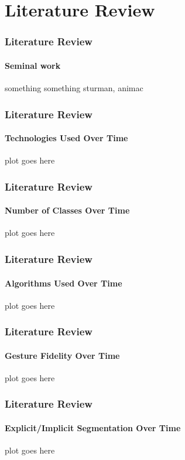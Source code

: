 \documentclass[xcolor={svgnames,table},10pt,fleqn]{beamer}
\begin{document}
\section{Literature Review}
\begin{frame}
    \frametitle{Literature Review}
    \framesubtitle{Seminal work}
    something something sturman, animac
\end{frame}

\begin{frame}
    \frametitle{Literature Review}
    \framesubtitle{Technologies Used Over Time}
    plot goes here
\end{frame}

\begin{frame}
    \frametitle{Literature Review}
    \framesubtitle{Number of Classes Over Time}
    plot goes here
\end{frame}

\begin{frame}
    \frametitle{Literature Review}
    \framesubtitle{Algorithms Used Over Time}
    plot goes here
\end{frame}

\begin{frame}
    \frametitle{Literature Review}
    \framesubtitle{Gesture Fidelity Over Time}
    plot goes here
\end{frame}

\begin{frame}
    \frametitle{Literature Review}
    \framesubtitle{Explicit/Implicit Segmentation Over Time}
    plot goes here
\end{frame}
\end{document}
